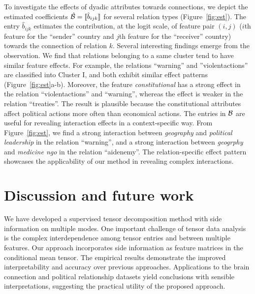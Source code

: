 \documentclass[12pt]{article}
\theoremstyle{definition}
\theoremstyle{definition}
\begin{document}
To investigate the effects of dyadic attributes towards connections, we depict the estimated coefficients $\hat {\mathcal{B}}=\llbracket \hat b_{ijk} \rrbracket$ for several relation types (Figure~\ref{fig:est}). {  The entry $\hat b_{ijk}$ estimates the contribution, at the logit scale, of feature pair $(i,j)$ ($i$th feature for the ``sender'' country and $j$th feature for the ``receiver'' country) towards the connection of relation $k$.} Several interesting findings emerge from the observation. We find that relations belonging to a same cluster tend to have similar feature effects. For example, the relations ``warning'' and ''violentactions'' are classified into Cluster I, and both exhibit similar effect patterns (Figure~\ref{fig:est}a-b). Moreover, the feature \emph{constitutional} has a strong effect in the relation ``violentactions'' and ``warning'', whereas the effect is weaker in the relation ``treaties''. The result is plausible because the constitutional attributes affect political actions more often than economical actions. The entries in $\mathcal{B}$ are useful for revealing interaction effects in a context-specific way. 
From Figure~\ref{fig:est}, we find a strong interaction between \emph{geography} and \emph{political leadership} in the relation ``warning'', and a strong interaction between \emph{geogrphy} and \emph{medicine ngo} in the relation ``aidenemy''. The relation-specific effect pattern showcases the applicability of our method in revealing complex interactions. 

\vspace{-0.5cm}

\section{Discussion and future work}\label{sec:con}
We have developed a supervised tensor decomposition method with side information on multiple modes. One important challenge of tensor data analysis is the complex interdependence among tensor entries and between multiple features. Our approach incorporates side information as feature matrices in the conditional mean tensor. The empirical results demonstrate the improved interpretability and accuracy over previous approaches. Applications to the brain connection and political relationship datasets yield conclusions with sensible interpretations, suggesting the practical utility of the proposed approach.
 
\end{document}
